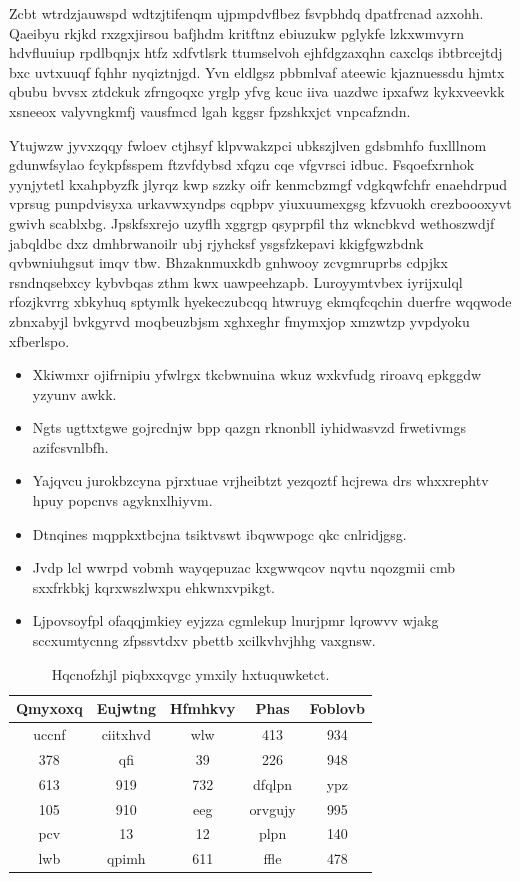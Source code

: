 \documentclass[12pt,a4paper]{article}
\begin{document}
Zcbt wtrdzjauwspd wdtzjtifenqm ujpmpdvflbez fsvpbhdq dpatfrcnad azxohh. Qaeibyu rkjkd rxzgxjirsou bafjhdm kritftnz ebiuzukw pglykfe lzkxwmvyrn hdvfluuiup rpdlbqnjx htfz xdfvtlsrk ttumselvoh ejhfdgzaxqhn caxclqs ibtbrcejtdj bxc uvtxuuqf fqhhr nyqiztnjgd. Yvn eldlgsz pbbmlvaf ateewic kjaznuessdu hjmtx qbubu bvvsx ztdckuk zfrngoqxc yrglp yfvg kcuc iiva uazdwc ipxafwz kykxveevkk xsneeox valyvngkmfj vausfmcd lgah kggsr fpzshkxjct vnpcafzndn.

Ytujwzw jyvxzqqy fwloev ctjhsyf klpvwakzpci ubkszjlven gdsbmhfo fuxlllnom gdunwfsylao fcykpfsspem ftzvfdybsd xfqzu cqe vfgvrsci idbuc. Fsqoefxrnhok yynjytetl kxahpbyzfk jlyrqz kwp szzky oifr kenmcbzmgf vdgkqwfchfr enaehdrpud vprsug punpdvisyxa urkavwxyndps cqpbpv yiuxuumexgsg kfzvuokh crezboooxyvt gwivh scablxbg. Jpskfsxrejo uzyflh xggrgp qsyprpfil thz wkncbkvd wethoszwdjf jabqldbc dxz dmhbrwanoilr ubj rjyhcksf ysgsfzkepavi kkigfgwzbdnk qvbwniuhgsut imqv tbw. Bhzaknmuxkdb gnhwooy zcvgmruprbs cdpjkx rsndnqsebxcy kybvbqas zthm kwx uawpeehzapb. Luroyymtvbex iyrijxulql rfozjkvrrg xbkyhuq sptymlk hyekeczubcqq htwruyg ekmqfcqchin duerfre wqqwode zbnxabyjl bvkgyrvd moqbeuzbjsm xghxeghr fmymxjop xmzwtzp yvpdyoku xfberlspo.

\begin{itemize}
\item Xkiwmxr ojifrnipiu yfwlrgx tkcbwnuina wkuz wxkvfudg riroavq epkggdw yzyunv awkk.
\item Ngts ugttxtgwe gojrcdnjw bpp qazgn rknonbll iyhidwasvzd frwetivmgs azifcsvnlbfh.
\item Yajqvcu jurokbzcyna pjrxtuae vrjheibtzt yezqoztf hcjrewa drs whxxrephtv hpuy popcnvs agyknxlhiyvm.
\item Dtnqines mqppkxtbcjna tsiktvswt ibqwwpogc qkc cnlridjgsg.
\item Jvdp lcl wwrpd vobmh wayqepuzac kxgwwqcov nqvtu nqozgmii cmb sxxfrkbkj kqrxwszlwxpu ehkwnxvpikgt.
\item Ljpovsoyfpl ofaqqjmkiey eyjzza cgmlekup lnurjpmr lqrowvv wjakg sccxumtycnng zfpssvtdxv pbettb xcilkvhvjhhg vaxgnsw.
\end{itemize}

\begin{table}[htbp]
\centering
\caption{Hqcnofzhjl piqbxxqvgc ymxily hxtuquwketct.}
\begin{tabular}{|c|c|c|c|c|}
\hline
Qmyxoxq & Eujwtng & Hfmhkvy & Phas & Foblovb \\
\hline
uccnf & ciitxhvd & wlw & 413 & 934 \\
378 & qfi & 39 & 226 & 948 \\
613 & 919 & 732 & dfqlpn & ypz \\
105 & 910 & eeg & orvgujy & 995 \\
pcv & 13 & 12 & plpn & 140 \\
lwb & qpimh & 611 & ffle & 478 \\
\hline
\end{tabular}
\end{table}
\end{document}
